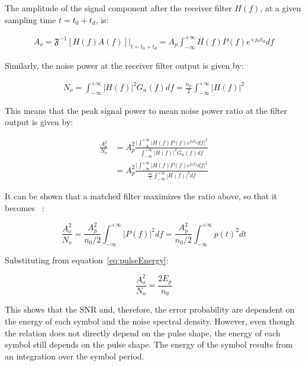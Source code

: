 \begin{refsection}
The amplitude of the signal component after the receiver filter $H(f)$, at a given sampling time $t=t_0+t_d$, is:

\begin{eqnarray}
A_o = \mathfrak{F}^{-1}\left[H(f) A(f)\right]\big|_{t=t_0+t_d} = A_p \int_{-\infty}^{+\infty} H(f) P(f) e^{+j \omega t_d}df
\end{eqnarray}

Similarly, the noise power at the receiver filter output is given by:

\begin{eqnarray}
N_o = \int_{-\infty}^{+\infty} {|H(f)|}^2 G_n(f) df = \frac{n_0}{2} \int_{-\infty}^{+\infty} {|H(f)|}^2
\end{eqnarray}

This means that the peak signal power to mean noise power ratio at the filter output is given by:

\begin{eqnarray}
\frac{A_o^2}{N_o} &= A_p^2 \frac{\big|\int_{-\infty}^{+\infty} |H(f) P(f)e^{j\omega t_d} df\big|^2}{\int_{-\infty}^{+\infty} {|H(f)|}^2 G_n(f) df}\\\nonumber
				  &= A_p^2 \frac{\big|\int_{-\infty}^{+\infty} |H(f) P(f)e^{j\omega t_d} df\big|^2}{\frac{n_0}{2}\int_{-\infty}^{+\infty} {|H(f)|}^2df}
\end{eqnarray}

It can be shown that a matched filter maximizes the ratio above, so that it becomes~\cite{carlson1986communication} :

\begin{equation}
\frac{A_o^2}{N_o} = \frac{A_p^2}{n_0/2} \int_{-\infty}^{+\infty} |P(f)|^2 df = \frac{A_p^2}{n_0/2} \int_{-\infty}^{+\infty} p(t)^2 dt
\end{equation}

Substituting from equation~\ref{eq:pulseEnergy}:

\begin{equation}
\frac{A_o^2}{N_o} = \frac{2 E_p}{n_0}
\end{equation}

This shows that the SNR and, therefore, the error probability are dependent on the energy of each symbol and the noise spectral density. However, even though the relation does not directly depend on the pulse shape, the energy of each symbol still depends on the pulse shape. The energy of the symbol results from an integration over the symbol period.


\end{refsection}
